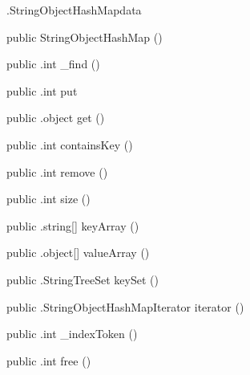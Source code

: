 \begin{CrexxClass}{.StringObjectHashMap}{data}

  \begin{Hierarchy}
  \end{Hierarchy}

  \begin{Members}

    \Factory
      {public}
      {StringObjectHashMap}
      {()}

    \Method
      {public}
      {.int}
      {\_find}
      {()}

    \Method
      {public}
      {.int}
      {put}
      {}

    \Method
      {public}
      {.object}
      {get}
      {()}

    \Method
      {public}
      {.int}
      {containsKey}
      {()}

    \Method
      {public}
      {.int}
      {remove}
      {()}

    \Method
      {public}
      {.int}
      {size}
      {()}

    \Method
      {public}
      {.string[]}
      {keyArray}
      {()}

    \Method
      {public}
      {.object[]}
      {valueArray}
      {()}

    \Method
      {public}
      {.StringTreeSet}
      {keySet}
      {()}

    \Method
      {public}
      {.StringObjectHashMapIterator}
      {iterator}
      {()}

    \Method
      {public}
      {.int}
      {\_indexToken}
      {()}

    \Method
      {public}
      {.int}
      {free}
      {()}

  \end{Members}
\end{CrexxClass}

